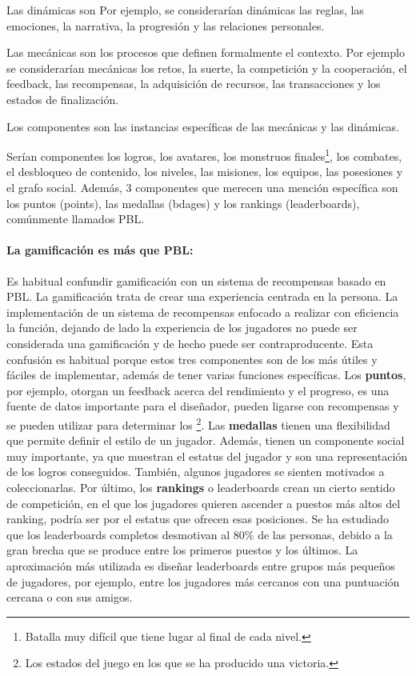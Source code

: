 Las dinámicas son 
%
Por ejemplo, se considerarían dinámicas las reglas, las emociones, la narrativa, la progresión y las relaciones personales.

 Las mecánicas son los procesos que definen formalmente el contexto. 
%
Por ejemplo se considerarían mecánicas los retos, la suerte, la competición y la cooperación, el feedback, las recompensas, la adquisición de recursos, las transacciones y los estados de finalización.

 Los componentes son las instancias específicas de las mecánicas y las dinámicas. 

Serían componentes los logros, los avatares, los monstruos finales\footnote{Batalla muy difícil que tiene lugar al final de cada nivel.}, los combates, el desbloqueo de contenido, los niveles, las misiones, los equipos, las posesiones y el grafo social.
%
Además, 3 componentes que merecen una mención específica son los puntos (points), las medallas (bdages) y los rankings (leaderboards), comúnmente llamados \gls{PBL}.

\paragraph{La gamificación es más que \gls{PBL}:} Es habitual confundir gamificación con un sistema de recompensas basado en \gls{PBL}. 
%
La gamificación trata de crear una experiencia centrada en la persona. 
%
La implementación de un sistema de recompensas enfocado a realizar con eficiencia la función, dejando de lado la experiencia de los jugadores no puede ser considerada una gamificación y de hecho puede ser contraproducente.
%
Esta confusión es habitual porque estos tres componentes son de los más útiles y fáciles de implementar, además de tener varias funciones específicas.
%
Los \textbf{puntos}, por ejemplo, otorgan un feedback acerca del rendimiento y el progreso, es una fuente de datos importante para el diseñador, pueden ligarse con recompensas y se pueden utilizar para determinar los \footnote{Los estados del juego en los que se ha producido una victoria.}.
%
Las \textbf{medallas} tienen una flexibilidad que permite definir el estilo de un jugador. 
%
Además, tienen un componente social muy importante, ya que muestran el estatus del jugador y son una representación de los logros conseguidos. 
%
También, algunos jugadores se sienten motivados a coleccionarlas.
%
Por último, los \textbf{rankings} o leaderboards crean un cierto sentido de competición, en el que los jugadores quieren ascender a puestos más altos del ranking, podría ser por el estatus que ofrecen esas posiciones.
%
Se ha estudiado que los leaderboards completos desmotivan al 80\% de las personas, debido a la gran brecha que se produce entre los primeros puestos y los últimos.
%
La aproximación más utilizada es diseñar leaderboards entre grupos más pequeños de jugadores, por ejemplo, entre los jugadores más cercanos con una puntuación cercana o con sus amigos.

